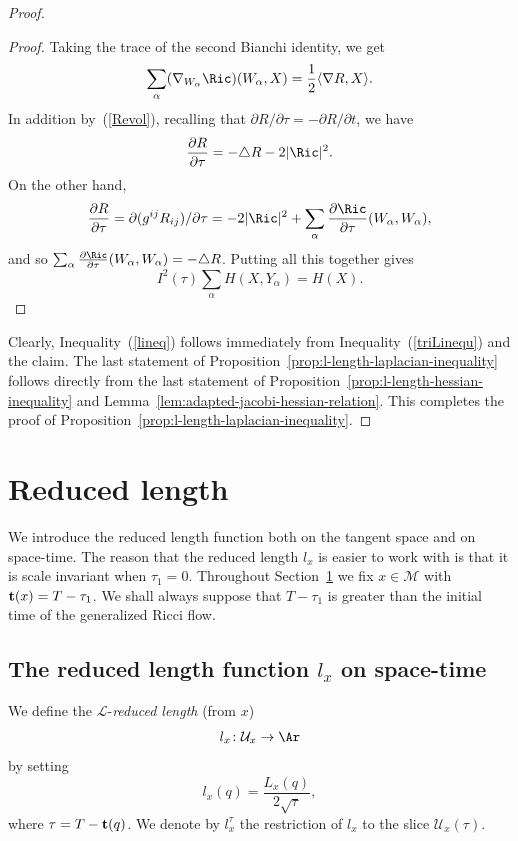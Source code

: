 \begin{proof}
\begin{proof}
Taking the trace of the second Bianchi identity, we get
$$\sum_{\alpha}(\nabla_{W_\alpha}
\Ric)(W_{\alpha},X) =\frac{1}{2}\langle \nabla R,X\rangle .$$ In addition
by~(\ref{Revol}), recalling that $\partial R/\partial\tau=-\partial R/\partial
t$, we have
$$\frac{\partial R}{\partial \tau} = -\triangle R - 2|\Ric|^{2}.$$
On the other hand, $$\frac{\partial R}{\partial\tau} =
\partial(g^{ij}R_{ij})/\partial{\tau}= -2|\Ric|^{2} + \sum_{\alpha}\frac{\partial\Ric}{\partial\tau}(W_{\alpha}, W_{\alpha}),$$ and so
$\sum_{\alpha}\frac{\partial\Ric}{\partial\tau}(W_{\alpha},W_{\alpha}) = -\triangle R$. Putting
all this together gives
$$I^2(\tau)\sum_{\alpha}H(X,Y_{\alpha})= H(X).$$
\end{proof}

Clearly, Inequality~(\ref{lineq}) follows immediately from
Inequality~(\ref{triLinequ}) and the claim. The last statement of
Proposition~\ref{prop:l-length-laplacian-inequality} follows directly from the last statement of
Proposition~\ref{prop:l-length-hessian-inequality} and Lemma~\ref{lem:adapted-jacobi-hessian-relation}. This completes
the proof of Proposition~\ref{prop:l-length-laplacian-inequality}.
\end{proof}


\section{Reduced length}\label{sect:redln}

We introduce the reduced length function both on the tangent space
and on space-time. The reason that the reduced length $l_x$ is
easier to work with is that it is scale invariant when $\tau_1=0$.
Throughout Section~\ref{sect:redln} we fix $x\in{\mathcal M}$ with
${\bf t}(x)=T-\tau_1$. We shall always suppose that $T-\tau_1$ is
greater than the initial time of the generalized Ricci flow.

\subsection{The reduced length function $l_x$ on space-time}




\begin{definition}\label{def:reduced-length}
We define
 the $\mathcal{L}$-{\sl reduced length} (from $x$)
$$l_x\colon {\mathcal U}_x\to \Ar$$
by setting $$l_x(q)= \frac{L_x(q)}{2\sqrt{\tau}},$$ where $\tau=T-{\bf t}(q)$.
We denote by $l_x^\tau$ the restriction of $l_x$ to the slice ${\mathcal
U}_x(\tau)$.
\end{definition}


